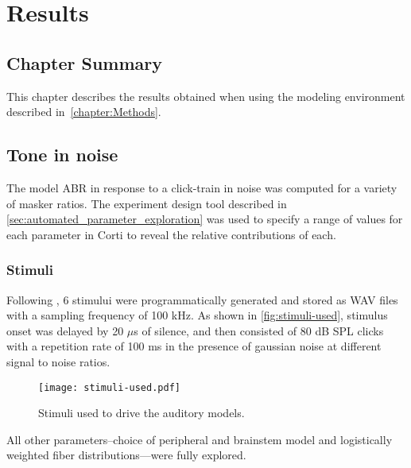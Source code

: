 \chapter{Results}
\label{chapter:Results}
\thispagestyle{myheadings}

\graphicspath{{5_Results/Figures/}}
\section{Chapter Summary} %
\label{sec:results_summary}
This chapter describes the results obtained when using the modeling environment described in~\autoref{chapter:Methods}.
\section{Tone in noise} %
\label{sec:tone_in_noise}
The model ABR in response to a click-train in noise was computed for a variety of masker ratios.   
The experiment design tool described in \autoref{sec:automated_parameter_exploration} was used to specify a range of values for each parameter in Corti to reveal the relative contributions of each. 

\subsection{Stimuli} %
\label{sub:stimuli}
Following \citeauthor{Mehraei2015Auditory,Mehraei2016Auditory}, 6 stimului were programmatically generated and stored as WAV files with a sampling frequency of 100 kHz.  As shown in \autoref{fig:stimuli-used}, stimulus onset was delayed by 20 $\mu$s of silence, and then consisted of 80 dB SPL clicks with a repetition rate of 100 ms in the presence of gaussian noise at different signal to noise ratios. 

\begin{figure}[htbp]
	\centering
	\texttt{[image: stimuli-used.pdf]}
	\caption[Experimental Stimuli]{Stimuli used to drive the auditory models.}
	\label{fig:stimuli-used}
\end{figure}

All other parameters--choice of peripheral and brainstem model and logistically weighted fiber distributions---were fully explored.

